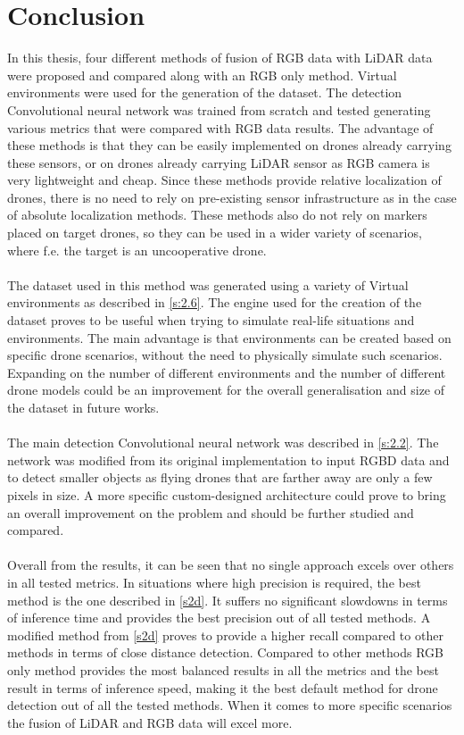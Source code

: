 \documentclass[twoside]{ctuthesis}
\theoremstyle{plain}
\theoremstyle{definition}
\theoremstyle{note}
\begin{document}
\chapter{Conclusion}
In this thesis, four different methods of fusion of RGB data with LiDAR data were proposed and compared along with an RGB only method. Virtual environments were used for the generation of the dataset. The detection Convolutional neural network was trained from scratch and tested generating various metrics that were compared with RGB data results. The advantage of these methods is that they can be easily implemented on drones already carrying these sensors, or on drones already carrying LiDAR sensor as RGB camera is very lightweight and cheap. Since these methods provide relative localization of drones, there is no need to rely on pre-existing sensor infrastructure as in the case of absolute localization methods. These methods also do not rely on markers placed on target drones, so they can be used in a wider variety of scenarios, where f.e. the target is an uncooperative drone.\\
\\
The dataset used in this method was generated using a variety of Virtual environments as described in \autoref{s:2.6}. The engine used for the creation of the dataset proves to be useful when trying to simulate real-life situations and environments. The main advantage is that environments can be created based on specific drone scenarios, without the need to physically simulate such scenarios. Expanding on the number of different environments and the number of different drone models could be an improvement for the overall generalisation and size of the dataset in future works.\\
\\
The main detection Convolutional neural network was described in \autoref{s:2.2}. The network was modified from its original implementation to input RGBD data and to detect smaller objects as flying drones that are farther away are only a few pixels in size. A more specific custom-designed architecture could prove to bring an overall improvement on the problem and should be further studied and compared.\\
\\
Overall from the results, it can be seen that no single approach excels over others in all tested metrics. In situations where high precision is required, the best method is the one described in \autoref{s2d}. It suffers no significant slowdowns in terms of inference time and provides the best precision out of all tested methods. A modified method from \autoref{s2d} proves to provide a higher recall compared to other methods in terms of close distance detection. Compared to other methods RGB only method provides the most balanced results in all the metrics and the best result in terms of inference speed, making it the best default method for drone detection out of all the tested methods. When it comes to more specific scenarios the fusion of LiDAR and RGB data will excel more.\\
\end{document}
